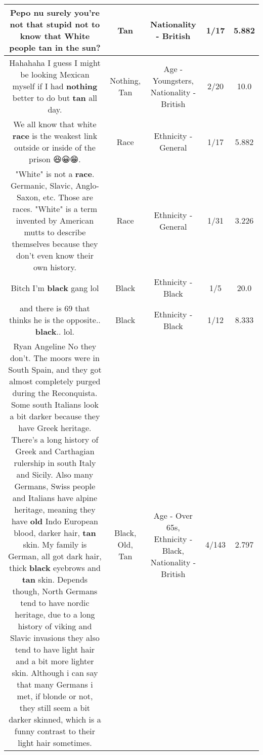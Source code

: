 \documentclass[11pt]{article}
\newlength\mylength
\begin{document}
\begin{center}
\begin{longtable}{|C{.65\mylength}|C{.30\mylength}|C{.12\mylength}|C{.12\mylength}|C{.12\mylength}|}
  \small Pepo nu surely you're not that stupid not to know that White people \textbf{tan} in the sun?\normalsize   & Tan & Nationality - British & 1/17 & 5.882 \\  \hline
  \small Hahahaha I guess I might be looking Mexican myself if I had \textbf{nothing} better to do but \textbf{tan} all day.\normalsize   & Nothing, Tan & Age - Youngsters, Nationality - British & 2/20 & 10.0 \\  \hline
  \small We all know that white \textbf{race} is the weakest link outside or inside of the prison 😆😀😁.\normalsize   & Race & Ethnicity - General & 1/17 & 5.882 \\  \hline
  \small "White" is not a \textbf{race}. Germanic, Slavic, Anglo-Saxon, etc. Those are races. "White" is a term invented by American mutts to describe themselves because they don't even know their own history.\normalsize   & Race & Ethnicity - General & 1/31 & 3.226 \\  \hline
  \small Bitch I'm \textbf{black} gang lol\normalsize   & Black & Ethnicity - Black & 1/5 & 20.0 \\  \hline
  \small and there is 69 that thinks he is the opposite.. \textbf{black}.. lol.\normalsize   & Black & Ethnicity - Black & 1/12 & 8.333 \\  \hline
  \small Ryan Angeline No they don't. The moors were in South Spain, and they got almost completely purged during the Reconquista. Some south Italians look a bit darker because they have Greek heritage. There's a long history of Greek and Carthagian rulership in south Italy and Sicily. Also many Germans, Swiss people and Italians have alpine heritage, meaning they have \textbf{old} Indo European blood, darker hair, \textbf{tan} skin. My family is German, all got dark hair, thick \textbf{black} eyebrows and \textbf{tan} skin. Depends though, North Germans tend to have nordic heritage, due to a long history of viking and Slavic invasions they also tend to have light hair and a bit more lighter skin. Although i can say that many Germans i met, if blonde or not, they still seem a bit darker skinned, which is a funny contrast to their light hair sometimes.\normalsize   & Black, Old, Tan & Age - Over 65s, Ethnicity - Black, Nationality - British & 4/143 & 2.797 \\  \hline

\end{longtable}
\end{center}
\end{document}
